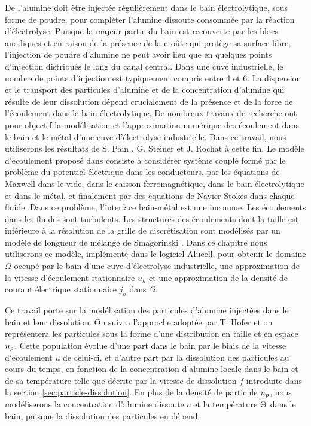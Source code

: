 De l'alumine doit être injectée régulièrement dans le bain
électrolytique, sous forme de poudre, pour compléter l'alumine
dissoute consommée par la réaction d'électrolyse. Puisque la majeur
partie du bain est recouverte par les blocs anodiques et en raison de
la présence de la croûte qui protège sa surface libre, l'injection de
poudre d'alumine ne peut avoir lieu que en quelques points d'injection
distribués le long du canal central. Dans une cuve industrielle, le
nombre de points d'injection est typiquement compris entre 4 et 6. La
dispersion et le transport des particules d'alumine et de la
concentration d'alumine qui résulte de leur dissolution dépend
crucialement de la présence et de la force de l'écoulement dans le
bain électrolytique. De nombreux travaux de recherche ont pour
objectif la modélisation et l'approximation numérique des écoulement
dans le bain et le métal d'une cuve d'électrolyse industrielle. Dans
ce travail, nous utiliserons les résultats de S. Pain \cite{Pain2006},
G. Steiner \cite{Steiner2009} et J. Rochat \cite{Rochat2016} à cette
fin. Le modèle d'écoulement proposé dans \cite{Steiner2009} consiste à
considérer système couplé formé par le problème du potentiel
électrique dans les conducteurs, par les équations de Maxwell dans le
vide, dans le caisson ferromagnétique, dans le bain électrolytique et
dans le métal, et finalement par des équations de Navier-Stokes dans
chaque fluide. Dans ce problème, l'interface bain-métal est une
inconnue. Les écoulements dans les fluides sont turbulents. Les
structures des écoulements dont la taille est inférieure à la
résolution de la grille de discrétisation sont modélisés par un modèle
de longueur de mélange de Smagorinski \cite{Rochat2016}. Dans ce
chapitre nous utiliserons ce modèle, implémenté dans le logiciel
Alucell, pour obtenir le domaine $\Omega$ occupé par le bain d'une cuve
d'électrolyse industrielle, une approximation de la vitesse
d'écoulement stationnaire $u_h$ et une approximation de la densité de
courant électrique stationnaire $j_h$ dans $\Omega$.

Ce travail porte sur la modélisation des particules d'alumine
injectées dans le bain et leur dissolution. On suivra l'approche
adoptée par T. Hofer \cite{Hofer2011} et on représentera les
particules sous la forme d'une distribution en taille et en espace
$n_p$. Cette population évolue d'une part dans le bain par
le biais de la vitesse d'écoulement $u$ de celui-ci, et d'autre part par
la dissolution des particules au cours du temps, en fonction de la
concentration d'alumine locale dans le bain et de sa température telle
que décrite par la vitesse de dissolution $f$ introduite dans la
section \ref{sec:particle-dissolution}. En plus de la densité de
particule $n_p$, nous modéliserons la concentration d'alumine
dissoute $c$ et la température $\Theta$ dans le bain, puisque
la dissolution des particules en dépend.

